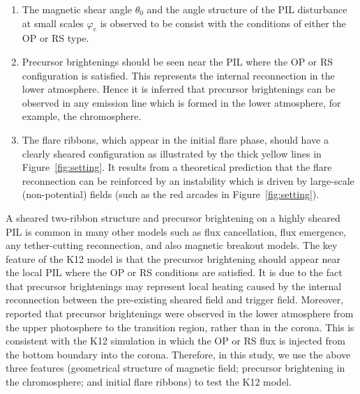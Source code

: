 \documentclass[10pt,preprint2]{aastex}
\begin{document}
\renewcommand{\theenumi}{\Roman{enumi}}
\begin{enumerate}

	\item[I.] The magnetic shear angle $\theta_{0}$ and the angle structure of the PIL disturbance at small scales $\varphi_{e}$ is observed to be consist with the conditions of either the OP or RS type.
	
	\item[I\hspace{-.1em}I.] Precursor brightenings should be seen near the PIL where the OP or RS configuration is satisfied. This represents the internal reconnection in the lower atmosphere. Hence it is inferred that precursor brightenings can be observed in any emission line which is formed in the lower atmosphere, for example, the chromosphere.
	
	\item[I\hspace{-.1em}I\hspace{-.1em}I.] The flare ribbons, which appear in the initial flare phase, should have a clearly sheared configuration as illustrated by the thick yellow lines in Figure~\ref{fig:setting}. It results from a theoretical prediction that the flare reconnection can be reinforced by an instability which is driven by large-scale (non-potential) fields (such as the red arcades in Figure~\ref{fig:setting}).
	
\end{enumerate}

A sheared two-ribbon structure and precursor brightening on a highly sheared PIL is common in many other models such as flux cancellation, flux emergence, any tether-cutting reconnection, and also magnetic breakout models.
The key feature of the K12 model is that the precursor brightening should appear near the local PIL where the OP or RS conditions are satisfied.
It is due to the fact that precursor brightenings may represent local heating caused by the internal reconnection between the pre-existing sheared field and trigger field.
Moreover, \citet{bamba13, bamba14} reported that precursor brightenings were observed in the lower atmosphere from the upper photosphere to the transition region, rather than in the corona.
This is consistent with the K12 simulation in which the OP or RS flux is injected from the bottom boundary into the corona.
Therefore, in this study, we use the above three features (geometrical structure of magnetic field; precursor brightening in the chromosphere; and initial flare ribbons) to test the K12 model.
\end{document}
